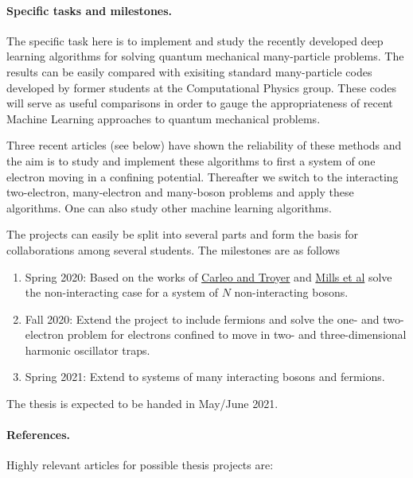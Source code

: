 \documentclass[%
oneside,                 %
final,                   %
10pt]{article}
\begin{document}
\paragraph{Specific tasks and milestones.}
The specific task here is to implement and study the recently developed
deep learning algorithms for solving quantum mechanical many-particle
problems. The results can  be easily compared with exisiting standard
many-particle codes developed by former students at the Computational
Physics group. These codes will serve as useful comparisons in order
to gauge the appropriateness of recent Machine Learning approaches to
quantum mechanical problems.

Three recent articles (see below) have shown the reliability of these methods and
the aim is to study and implement these algorithms to first a system
of one electron moving in a confining potential. Thereafter we switch
to the interacting two-electron, many-electron and many-boson problems and apply
these algorithms.  One can also study other machine learning algorithms. 


The projects can easily be split into several parts and form the basis for collaborations among several students. The milestones are as follows
\begin{enumerate}
\item Spring 2020: Based on the works of \href{{http://science.sciencemag.org/content/355/6325/602}}{Carleo and Troyer} and \href{{https://journals.aps.org/pra/abstract/10.1103/PhysRevA.96.042113}}{Mills et al} solve the non-interacting case for a system of $N$ non-interacting bosons.

\item Fall 2020: Extend the project to include fermions and solve the one- and two-electron problem for electrons confined to move in two- and three-dimensional harmonic oscillator traps. 

\item Spring 2021: Extend to systems of many interacting bosons and fermions.
\end{enumerate}

\noindent
The thesis is expected to be handed in May/June  2021.

\paragraph{References.}
Highly relevant articles for possible thesis projects are:
\end{document}
